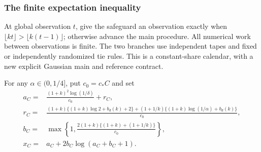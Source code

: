 \documentclass{article}
\theoremstyle{plain}
\theoremstyle{definition}
\begin{document}
\subsubsection{The finite expectation inequality}

At global observation $t$, give the safeguard an observation exactly
when $\lfloor kt\rfloor>\lfloor k(t-1)\rfloor$; otherwise advance
the main procedure.  All numerical work between observations is finite.
The two branches use independent tapes and fixed or independently
randomized tie rules.  This is a constant-share calendar, with a new explicit Gaussian main and reference contract.

For any $\alpha\in(0,1/4]$, put $c_0=c_*C$ and set
\begin{align}
 a_C={}&\frac{(1+k)^2\log(1/\delta)}{c_0}+r_C,\nonumber\\
 r_C={}&\frac{(1+k)\{(1+k)\log2+b_d(k)+2\}
              +(1+1/k)\{(1+k)\log(1/\alpha)+b_d(k)\}}{c_0},\nonumber\\
 b_C={}&\max\left\{1,
       \frac{2(1+k)\{(1+k)+(1+1/k)\}}{c_0}\right\},\nonumber\\
 x_C={}&a_C+2b_C\log(a_C+b_C+1).
 \label{eq:v10g-confirm-budget}
\end{align}
\end{document}
